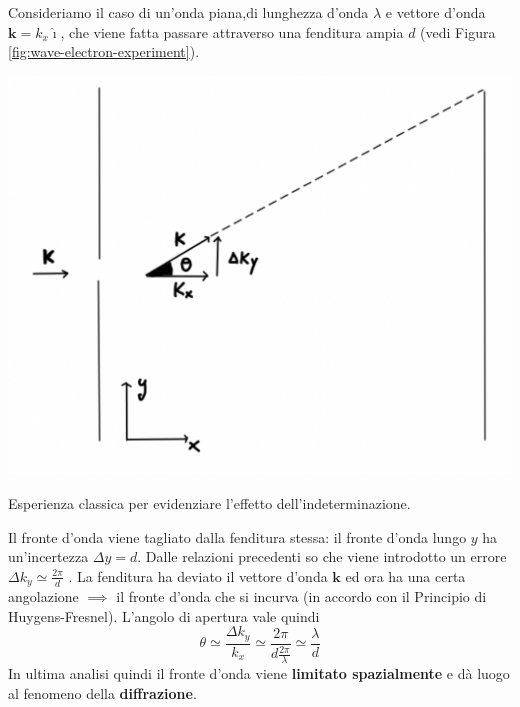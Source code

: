 Consideriamo il caso di un'onda piana,di lunghezza d'onda \(\lambda\) e
vettore d'onda \(\bm{k} = k_x \hat{\imath}\), che viene fatta passare
attraverso una fenditura ampia \(d\) (vedi Figura \ref{fig:wave-electron-experiment}).

\begin{marginfigure}
    \includegraphics{figs/wave-electron-experiment}
    \caption{Esperienza classica per evidenziare l'effetto dell'indeterminazione.}
    \label{fig:wave-electron-experiment}
\end{marginfigure}

Il fronte d'onda viene tagliato dalla fenditura stessa: il fronte d'onda
lungo \(y\) ha un'incertezza \(\Delta y = d\).
Dalle relazioni
precedenti so che viene introdotto un errore
\(\Delta k_{y} \simeq\frac{2\pi}{d}\) .
La fenditura ha deviato il
vettore d'onda \(\bm{k}\) ed ora ha una certa angolazione \(\implies\)
il fronte d'onda che si incurva (in accordo con il Principio di Huygens-Fresnel).
L'angolo di apertura vale quindi \[
                                     \theta \simeq\frac{\Delta k_{y}}{k_{x}} \simeq \frac{2\pi}{d  \frac{2\pi}{\lambda}} \simeq\frac{\lambda}{d}
\] In ultima analisi quindi il fronte d'onda viene \textbf{limitato
spazialmente} e dà luogo al fenomeno della \textbf{diffrazione}.

